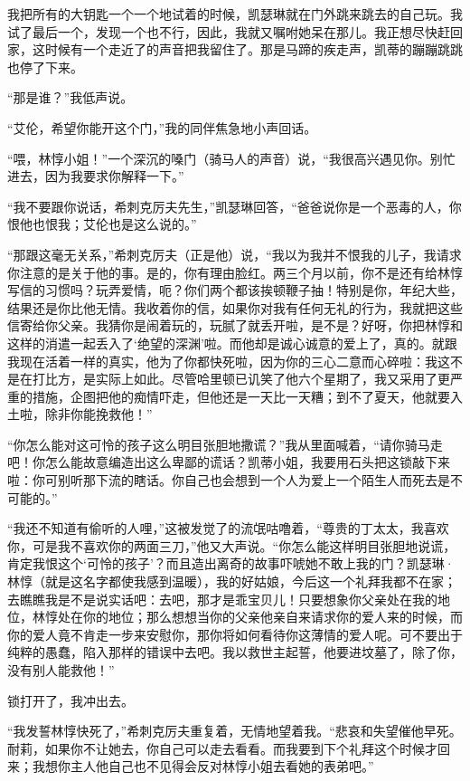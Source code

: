 \par 我把所有的大钥匙一个一个地试着的时候，凯瑟琳就在门外跳来跳去的自己玩。我试了最后一个，发现一个也不行，因此，我就又嘱咐她呆在那儿。我正想尽快赶回家，这时候有一个走近了的声音把我留住了。那是马蹄的疾走声，凯蒂的蹦蹦跳跳也停了下来。
\par “那是谁？”我低声说。
\par “艾伦，希望你能开这个门，”我的同伴焦急地小声回话。
\par “喂，林惇小姐！”一个深沉的嗓门（骑马人的声音）说，“我很高兴遇见你。别忙进去，因为我要求你解释一下。”
\par “我不要跟你说话，希刺克厉夫先生，”凯瑟琳回答，“爸爸说你是一个恶毒的人，你恨他也恨我；艾伦也是这么说的。”
\par “那跟这毫无关系，”希刺克厉夫（正是他）说，“我以为我并不恨我的儿子，我请求你注意的是关于他的事。是的，你有理由脸红。两三个月以前，你不是还有给林惇写信的习惯吗？玩弄爱情，呃？你们两个都该挨顿鞭子抽！特别是你，年纪大些，结果还是你比他无情。我收着你的信，如果你对我有任何无礼的行为，我就把这些信寄给你父亲。我猜你是闹着玩的，玩腻了就丢开啦，是不是？好呀，你把林惇和这样的消遣一起丢入了‘绝望的深渊’啦。而他却是诚心诚意的爱上了，真的。就跟我现在活着一样的真实，他为了你都快死啦，因为你的三心二意而心碎啦：我这不是在打比方，是实际上如此。尽管哈里顿已讥笑了他六个星期了，我又采用了更严重的措施，企图把他的痴情吓走，但他还是一天比一天糟；到不了夏天，他就要入土啦，除非你能挽救他！”
\par “你怎么能对这可怜的孩子这么明目张胆地撒谎？”我从里面喊着，“请你骑马走吧！你怎么能故意编造出这么卑鄙的谎话？凯蒂小姐，我要用石头把这锁敲下来啦：你可别听那下流的瞎话。你自己也会想到一个人为爱上一个陌生人而死去是不可能的。”
\par “我还不知道有偷听的人哩，”这被发觉了的流氓咕噜着，“尊贵的丁太太，我喜欢你，可是我不喜欢你的两面三刀，”他又大声说。“你怎么能这样明目张胆地说谎，肯定我恨这个‘可怜的孩子’？而且造出离奇的故事吓唬她不敢上我的门？凯瑟琳·林惇（就是这名字都使我感到温暖），我的好姑娘，今后这一个礼拜我都不在家；去瞧瞧我是不是说实话吧：去吧，那才是乖宝贝儿！只要想象你父亲处在我的地位，林惇处在你的地位；那么想想当你的父亲他亲自来请求你的爱人来的时候，而你的爱人竟不肯走一步来安慰你，那你将如何看待你这薄情的爱人呢。可不要出于纯粹的愚蠢，陷入那样的错误中去吧。我以救世主起誓，他要进坟墓了，除了你，没有别人能救他！”
\par 锁打开了，我冲出去。
\par “我发誓林惇快死了，”希刺克厉夫重复着，无情地望着我。“悲哀和失望催他早死。耐莉，如果你不让她去，你自己可以走去看看。而我要到下个礼拜这个时候才回来；我想你主人他自己也不见得会反对林惇小姐去看她的表弟吧。”
